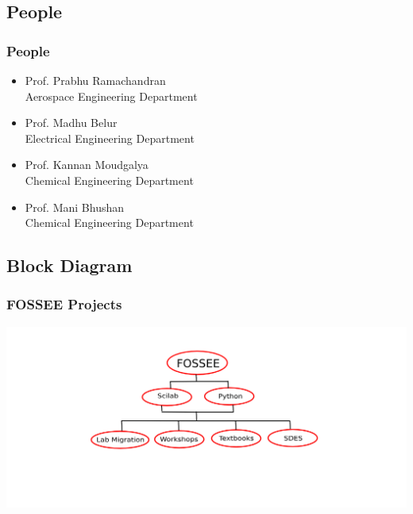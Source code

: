 \documentclass[compress,red]{beamer} %
\begin{document}
\subsection{People}
\begin{frame}
\frametitle{People}
\begin{itemize}
\item Prof. Prabhu Ramachandran \\ 
{\footnotesize Aerospace Engineering Department} \pause
\item Prof. Madhu Belur \\
{\footnotesize Electrical Engineering Department} \pause
\item Prof. Kannan Moudgalya \\
{\footnotesize Chemical Engineering Department}  \pause
\item Prof. Mani Bhushan \\
{\footnotesize Chemical Engineering Department}  
\end{itemize}
\end{frame}

\subsection{Block Diagram}
\begin{frame}
\frametitle{FOSSEE Projects}
\begin{center}
\includegraphics[scale=0.3]{blockdiagram.png}
\end{center}
\end{frame}
\end{document}
